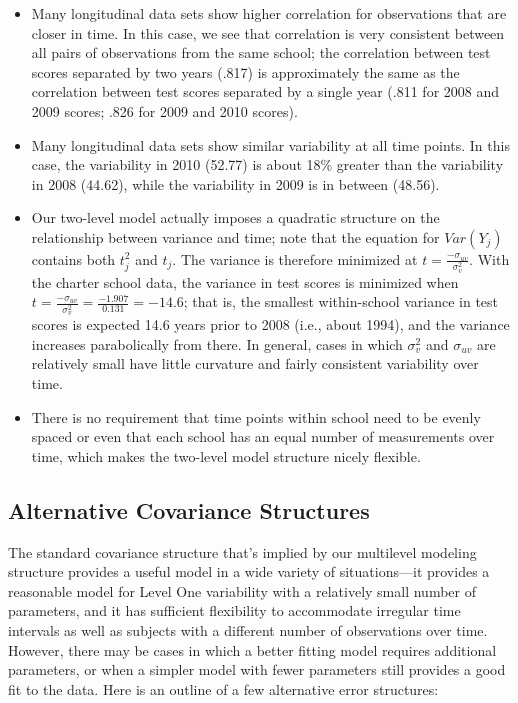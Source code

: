 \documentclass[
]{krantz}
\providecommand{\tightlist}{%
  \setlength{\itemsep}{0pt}\setlength{\parskip}{0pt}}
\begin{document}
\begin{itemize}
\tightlist
\item
  Many longitudinal data sets show higher correlation for observations that are closer in time. In this case, we see that correlation is very consistent between all pairs of observations from the same school; the correlation between test scores separated by two years (.817) is approximately the same as the correlation between test scores separated by a single year (.811 for 2008 and 2009 scores; .826 for 2009 and 2010 scores).
\item
  Many longitudinal data sets show similar variability at all time points. In this case, the variability in 2010 (52.77) is about 18\% greater than the variability in 2008 (44.62), while the variability in 2009 is in between (48.56).
\item
  Our two-level model actually imposes a quadratic structure on the relationship between variance and time; note that the equation for \(Var(Y_{j})\) contains both \(t^{2}_{j}\) and \(t_{j}\). The variance is therefore minimized at \(t=\frac{-\sigma_{uv}}{\sigma^{2}_{v}}\). With the charter school data, the variance in test scores is minimized when \(t=\frac{-\sigma_{uv}}{\sigma^{2}_{v}}=\frac{-1.907}{0.131}=-14.6\); that is, the smallest within-school variance in test scores is expected 14.6 years prior to 2008 (i.e., about 1994), and the variance increases parabolically from there. In general, cases in which \(\sigma^{2}_{v}\) and \(\sigma_{uv}\) are relatively small have little curvature and fairly consistent variability over time.
\item
  There is no requirement that time points within school need to be evenly spaced or even that each school has an equal number of measurements over time, which makes the two-level model structure nicely flexible.
\end{itemize}

\subsection{Alternative Covariance Structures}\label{alternateerror}

The standard covariance structure that's implied by our multilevel modeling structure provides a useful model in a wide variety of situations---it provides a reasonable model for Level One variability with a relatively small number of parameters, and it has sufficient flexibility to accommodate irregular time intervals as well as subjects with a different number of observations over time. However, there may be cases in which a better fitting model requires additional parameters, or when a simpler model with fewer parameters still provides a good fit to the data. Here is an outline of a few alternative error structures:
\end{document}

